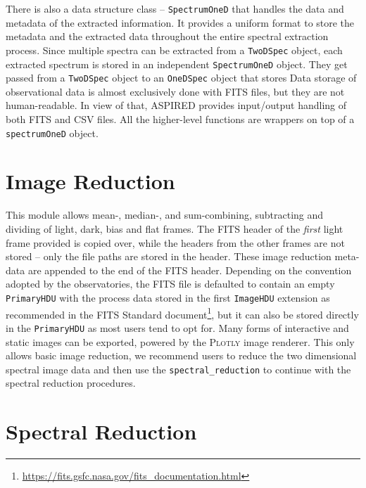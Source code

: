 \documentclass[linenumbers, twocolumn]{aastex631}
\begin{document}
There is also a data structure class -- \texttt{SpectrumOneD} that handles the
data and metadata of the extracted information. It provides a uniform format
to store the metadata and the extracted data throughout the entire spectral
extraction process. Since multiple spectra can be extracted from a
\texttt{TwoDSpec} object, each extracted spectrum is stored in an independent
\texttt{SpectrumOneD} object. They get passed from a \texttt{TwoDSpec} object
to an \texttt{OneDSpec} object that stores Data storage of observational data is
almost exclusively done with FITS files, but they are not human-readable. In
view of that, \textsc{ASPIRED} provides input/output handling of both FITS and
CSV files. All the higher-level functions are wrappers on top of a
\texttt{spectrumOneD} object.

\section{Image Reduction}
\label{sec:image_reduction}
This module allows mean-, median-, and sum-combining, subtracting and dividing
of light, dark, bias and flat frames. The FITS header of the \textit{first}
light frame provided is copied over, while the headers from the other frames
are not stored -- only the file paths are stored in the header. These image
reduction meta-data are appended to the end of the FITS header. Depending on
the convention adopted by the observatories, the FITS file is defaulted to
contain an empty \texttt{PrimaryHDU} with the process data stored in the
first \texttt{ImageHDU} extension as recommended in the FITS Standard 
document\footnote{\url{https://fits.gsfc.nasa.gov/fits_documentation.html}},
but it can also be stored directly in the \texttt{PrimaryHDU} as most users tend
to opt for. Many forms of interactive and static images can be exported,
powered by the \textsc{Plotly} image renderer. This only allows basic image
reduction, we recommend users to reduce the two dimensional spectral image
data and then use the \texttt{spectral\_reduction} to continue with the
spectral reduction procedures.

\section{Spectral Reduction}
\label{sec:spectral_reduction}
\end{document}
